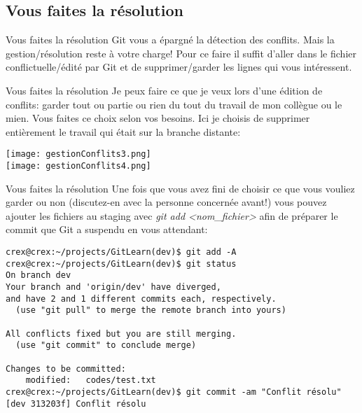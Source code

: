 \documentclass{beamer}
\begin{document}
\subsection{Vous faites la résolution}
\begin{frame}{Vous faites la résolution}
Git vous a épargné la détection des conflits. Mais la gestion/résolution reste à votre charge! Pour ce faire il suffit d'aller dans le fichier conflictuelle/édité par Git et de supprimer/garder les lignes qui vous intéressent.
\end{frame}

\begin{frame}{Vous faites la résolution}
Je peux faire ce que je veux lors d'une édition de conflits: garder tout ou partie ou rien du tout du travail de mon collègue ou le mien. Vous faites ce choix selon vos besoins. Ici je choisis de supprimer entièrement le travail qui était sur la branche distante:\\
\smallskip

\begin{center}
	\texttt{[image: gestionConflits3.png]}\\
	\vspace{0.5cm}
	\texttt{[image: gestionConflits4.png]}
\end{center}
\end{frame}

\begin{frame}[fragile]{Vous faites la résolution}
Une fois que vous avez fini de choisir ce que vous vouliez garder ou non (discutez-en avec la personne concernée avant!) vous pouvez ajouter les fichiers au staging avec \textit{git add <nom\_fichier>} afin de préparer le commit que Git a suspendu en vous attendant:

\begin{mdframed}[style=Bash]
\begin{lstlisting}[style=Bash, caption=Fin de résolution du conflit]
crex@crex:~/projects/GitLearn(dev)$ git add -A
crex@crex:~/projects/GitLearn(dev)$ git status
On branch dev
Your branch and 'origin/dev' have diverged,
and have 2 and 1 different commits each, respectively.
  (use "git pull" to merge the remote branch into yours)

All conflicts fixed but you are still merging.
  (use "git commit" to conclude merge)

Changes to be committed:
	modified:   codes/test.txt
crex@crex:~/projects/GitLearn(dev)$ git commit -am "Conflit résolu"
[dev 313203f] Conflit résolu
\end{lstlisting}
\end{mdframed}
\end{frame}
\end{document}
